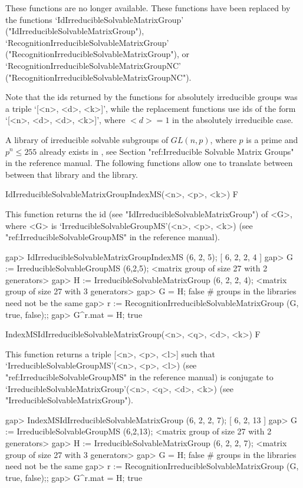 These functions are no longer available. These functions have been replaced by the
functions 
`IdIrreducibleSolvableMatrixGroup' ("IdIrreducibleSolvableMatrixGroup"), 
`RecognitionIrreducibleSolvableMatrixGroup' ("RecognitionIrreducibleSolvableMatrixGroup"), or
`RecognitionIrreducibleSolvableMatrixGroupNC' ("RecognitionIrreducibleSolvableMatrixGroupNC").

Note that the ids returned by the functions for absolutely irreducible groups was a triple `[<n>, <d>, <k>]', while the replacement functions use ids of the form `[<n>, <d>, <d>, <k>]', where $<d> = 1$ in the absolutely irreducible case.



A library of irreducible solvable subgroups of $GL(n, p)$, where $p$ is a 
prime and $p^n \leq 255$ already exists in {\GAP}, see Section "ref:Irreducible Solvable Matrix Groups" in the {\GAP} reference manual. The following functions
allow one to translate between between that library and the {\IRREDSOL} library. 


\>IdIrreducibleSolvableMatrixGroupIndexMS(<n>, <p>, <k>) F

This function returns the id (see "IdIrreducibleSolvableMatrixGroup") of <G>, 
where <G> is `IrreducibleSolvableGroupMS'(<n>, <p>, <k>) (see "ref:IrreducibleSolvableGroupMS" in the {\GAP} reference manual).

\beginexample
gap> IdIrreducibleSolvableMatrixGroupIndexMS (6, 2, 5);
[ 6, 2, 2, 4 ]
gap> G := IrreducibleSolvableGroupMS (6,2,5);
<matrix group of size 27 with 2 generators>
gap> H := IrreducibleSolvableMatrixGroup (6, 2, 2, 4);
<matrix group of size 27 with 3 generators>
gap> G = H;
false # groups in the libraries need not be the same
gap> r := RecognitionIrreducibleSolvableMatrixGroup (G, true, false);;
gap> G^r.mat = H;
true
\endexample

\>IndexMSIdIrreducibleSolvableMatrixGroup(<n>, <q>, <d>, <k>) F

This function returns a triple [<n>, <p>, <l>] such that
`IrreducibleSolvableGroupMS'(<n>, <p>, <l>) (see "ref:IrreducibleSolvableGroupMS" in the {\GAP} reference manual) is conjugate to
`IrreducibleSolvableMatrixGroup'(<n>, <q>, <d>, <k>) (see "IrreducibleSolvableMatrixGroup").

\beginexample
gap> IndexMSIdIrreducibleSolvableMatrixGroup (6, 2, 2, 7);
[ 6, 2, 13 ]
gap> G := IrreducibleSolvableGroupMS (6,2,13);
<matrix group of size 27 with 2 generators>
gap> H := IrreducibleSolvableMatrixGroup (6, 2, 2, 7);
<matrix group of size 27 with 3 generators>
gap> G = H;
false # groups in the libraries need not be the same
gap> r := RecognitionIrreducibleSolvableMatrixGroup (G, true, false);;
gap> G^r.mat = H;
true
\endexample


